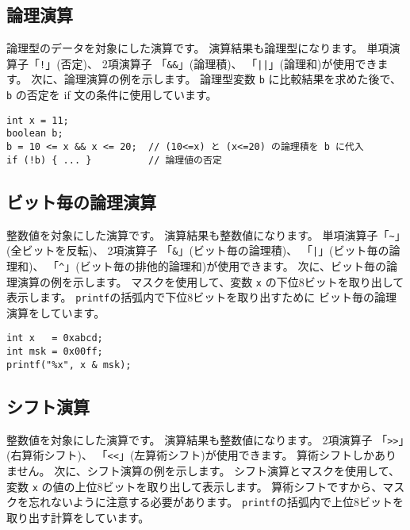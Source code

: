 \subsection{論理演算}

論理型のデータを対象にした演算です。
演算結果も論理型になります。
単項演算子「\verb/!/」(否定)、
2項演算子
「\verb/&&/」(論理積)、
「\verb/||/」(論理和)が使用できます。
次に、論理演算の例を示します。
論理型変数 \verb/b/ に比較結果を求めた後で、
\verb/b/ の否定を if 文の条件に使用しています。

\begin{mylist}
\begin{verbatim}
int x = 11;
boolean b;
b = 10 <= x && x <= 20;  // (10<=x) と (x<=20) の論理積を b に代入
if (!b) { ... }          // 論理値の否定
\end{verbatim}
\end{mylist}

\subsection{ビット毎の論理演算}

整数値を対象にした演算です。
演算結果も整数値になります。
単項演算子「\verb/~/」(全ビットを反転)、
2項演算子
「\verb/&/」(ビット毎の論理積)、
「\verb/|/」(ビット毎の論理和)、
「\verb/^/」(ビット毎の排他的論理和)が使用できます。
次に、ビット毎の論理演算の例を示します。
マスクを使用して、変数 \verb/x/ の下位8ビットを取り出して表示します。
\verb/printf/の括弧内で下位8ビットを取り出すために
ビット毎の論理演算をしています。

\begin{mylist}
\begin{verbatim}
int x   = 0xabcd;
int msk = 0x00ff;
printf("%x", x & msk);
\end{verbatim}
\end{mylist}

\subsection{シフト演算}

整数値を対象にした演算です。
演算結果も整数値になります。
2項演算子
「\verb/>>/」(右算術シフト)、
「\verb/<</」(左算術シフト)が使用できます。
算術シフトしかありません。
次に、シフト演算の例を示します。
シフト演算とマスクを使用して、
変数 \verb/x/ の値の上位8ビットを取り出して表示します。
算術シフトですから、マスクを忘れないように注意する必要があります。
\verb/printf/の括弧内で上位8ビットを取り出す計算をしています。


